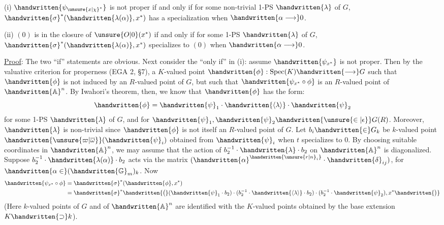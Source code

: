 (i) $\handwritten{\psi_{\unsure{x|\chi}^*}}$ is not proper if and only if for some non-trivial 1-PS $\handwritten{\lambda}$ of $G$, $\handwritten{\sigma}^*(\handwritten{\lambda(\alpha)},x^*)$ has a specialization when $\handwritten{\alpha\longrightarrow}0$.

(ii) $(0)$ is in the closure of $\unsure{O|0}(x^*)$ if and only if for some 1-PS $\handwritten{\lambda}$ of $G$, $\handwritten{\sigma}^*(\handwritten{\lambda(\alpha)},x^*)$ specializes to $(0)$ when $\handwritten{\alpha\longrightarrow}0$.

\uline{Proof}: The two ``if'' statements are obvious. Next consider the ``only if'' in (i): assume $\handwritten{\psi_{x^*}}$ is not proper. Then by the valuative criterion for properness (EGA 2, \S7),  a $K$-valued point $\handwritten{\phi}:\operatorname{Spec}(K)\handwritten{\longrightarrow}G$ such that $\handwritten{\phi}$ is not induced by an $R$-valued point of $G$, but such that $\handwritten{\psi_{x^*}\circ\phi}$ is an $R$-valued point of $\handwritten{\mathbb{A}}^n$. By Iwahori's theorem, then, we know that $\handwritten{\phi}$ has the form:
\[
\handwritten{\phi}=\handwritten{\psi}_1\cdot\handwritten{\langle\lambda\rangle}\cdot\handwritten{\psi}_2
\]
for some 1-PS $\handwritten{\lambda}$ of $G$, and for $\handwritten{\psi}_1,\handwritten{\psi}_2\handwritten{\unsure{\in|\epsilon}}G(R)$. Moreover, $\handwritten{\lambda}$ is non-trivial since $\handwritten{\phi}$ is not itself an $R$-valued point of $G$. Let $b_i\handwritten{\in}G_k$ be $k$-valued point $\handwritten{\unsure{\varpi|\overline{\omega}}}(\handwritten{\psi}_i)$ obtained from $\handwritten{\psi}_i$ when $t$ specializes to $0$. By choosing suitable coordinates in $\handwritten{\mathbb{A}}^n$, we may assume that the action of $b_2^{-1}\cdot\handwritten{\lambda}\cdot b_2$ on $\handwritten{\mathbb{A}}^n$ is diagonalized. Suppose $b_2^{-1}\cdot\handwritten{\lambda(\alpha)}\cdot b_2$ acts via the matrix $(\handwritten{\alpha}^{\handwritten{\unsure{r|n}_i}}\cdot\handwritten{\delta}_{ij})$, for $\handwritten{\alpha\in}(\handwritten{\mathbb{G}}_m)_k$. Now
\[
\begin{aligned}
\handwritten{\psi_{x^*}\circ\phi}&=\handwritten{\sigma}^*(\handwritten{\phi},x^*)\\
&=\handwritten{\sigma}^*\handwritten{\bigl(}(\handwritten{\psi}_1\cdot b_2)\cdot(b_2^{-1}\cdot\handwritten{\langle\lambda\rangle}\cdot b_2)\cdot(b_2^{-1}\cdot\handwritten{\psi}_2),x^*\handwritten{\bigr)}
\end{aligned}
\]
(Here $k$-valued points of $G$ and of $\handwritten{\mathbb{A}}^n$ are identified with the $K$-valued points obtained by the base extension $K\handwritten{\supset}k$).
